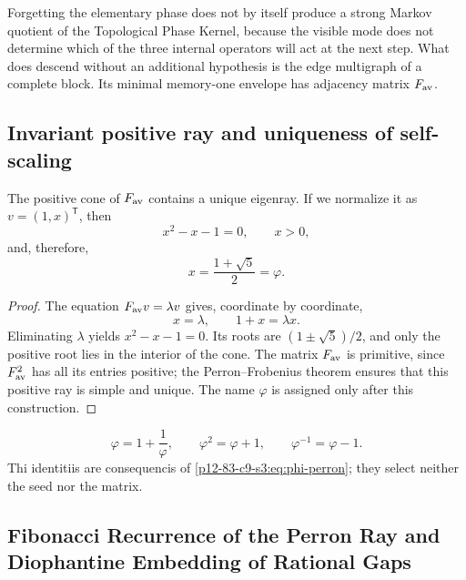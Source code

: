 \begin{remark}
Forgetting the elementary phase does not by itself produce a strong Markov
quotient of the Topological Phase Kernel, because the visible mode does not determine
which of the three internal operators will act at the next step. What
does descend without an additional hypothesis is the edge multigraph of a
complete block. Its minimal memory-one envelope has adjacency
matrix \(F_{\rm av}\).
\end{remark}

\subsection{Invariant positive ray and uniqueness of self-scaling}

\begin{theorem}
\label{p12-83-c9-s3:thm:rayo-perron-phi}
The positive cone of \(F_{\rm av}\) contains a unique eigenray. If we
normalize it as \(v=(1,x)^{\mathsf T}\), then
\[
 x^2-x-1=0,
 \qquad
 x>0,
\]
and, therefore,
\begin{equation}
 \boxed{x=\frac{1+\sqrt5}{2}=\varphi.}
 \label{p12-83-c9-s3:eq:phi-perron}
\end{equation}
\end{theorem}

\begin{proof}
The equation \(F_{\rm av}v=\lambda v\) gives, coordinate by coordinate,
\[
 x=\lambda,
 \qquad
 1+x=\lambda x.
\]
Eliminating \(\lambda\) yields \(x^2-x-1=0\). Its roots are \((1\pm\sqrt5)/2\), and only the positive root lies in the interior of the cone. The matrix \(F_{\rm av}\) is primitive, since \(F_{\rm av}^2\) has all its entries positive; the Perron--Frobenius theorem ensures that this positive ray is simple and unique. The name \(\varphi\) is assigned only after this construction.
\end{proof}

\begin{corollary}
\[
 \varphi=1+\frac1\varphi,
 \qquad
 \varphi^2=\varphi+1,
 \qquad
 \varphi^{-1}=\varphi-1.
\]
Thi identitiis are consequencis of \eqref{p12-83-c9-s3:eq:phi-perron}; they select neither
the seed nor the matrix.
\end{corollary}

\subsection{Fibonacci Recurrence of the Perron Ray and Diophantine Embedding of Rational Gaps}

